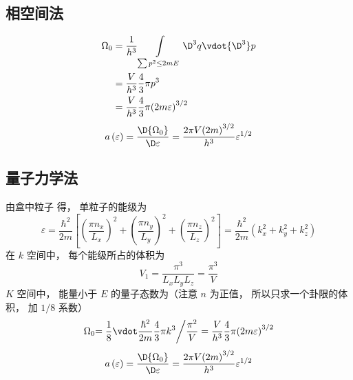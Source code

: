 
\subsection{相空间法}
\begin{equation}
    \begin{aligned}
    {\Omega_0} & = \frac{1}{{{h^3}}}\int\limits_{\sum {{p^2}}  \le 2mE} {{ \D ^3}q \vdot { \D ^3}p}  \\
    & = \frac{V}{{{h^3}}}\frac{4}{3}\pi {p^3} \\
    & = \frac{V}{{{h^3}}}\frac{4}{3}\pi {\left( {2m\varepsilon } \right)^{3/2}}
    \end{aligned}
  \end{equation}
  \begin{equation}
    a\left( \varepsilon  \right) = \frac{{ \D {\Omega_0}}}{{ \D \varepsilon }} = \frac{{2\pi V{{\left( {2m} \right)}^{3/2}}}}{{{h^3}}}{\varepsilon ^{1/2}}
  \end{equation}

\subsection{量子力学法}
由盒中粒子%
得， 单粒子的能级为
\begin{equation}
\varepsilon = \frac{{{\hbar ^2}}}{{2m}}\left[ {{{\left( {\frac{{\pi {n_x}}}{{{L_x}}}} \right)}^2} + {{\left( {\frac{{\pi {n_y}}}{{{L_y}}}} \right)}^2} + {{\left( {\frac{{\pi {n_z}}}{{{L_z}}}} \right)}^2}} \right] = \frac{{{\hbar ^2}}}{{2m}}\left( {k_x^2 + k_y^2 + k_z^2} \right)
\end{equation}
在 $k$ 空间中， 每个能级所占的体积为
\begin{equation}
{V_1} = \frac{{{\pi ^3}}}{{{L_x}{L_y}{L_z}}} = \frac{{{\pi ^3}}}{V}
\end{equation}
  $K$ 空间中， 能量小于 $E$ 的量子态数为（注意 $n$ 为正值， 所以只求一个卦限的体积， 加 $1/8$ 系数）
\begin{equation}
    {\Omega_0}{{ = \frac{1}{8} \vdot \frac{{{\hbar ^2}}}{{2m}}\frac{4}{3}\pi {k^3}} \mathord{\left/
 {\vphantom {{ = \frac{1}{8} \vdot \frac{{{\hbar ^2}}}{{2m}}\frac{4}{3}\pi {k^3}} {\frac{{{\pi ^2}}}{V}}}} \right.
 \kern-\nulldelimiterspace} {\frac{{{\pi ^2}}}{V}}} = \frac{V}{{{h^3}}}\frac{4}{3}\pi {\left( {2m\varepsilon } \right)^{3/2}}
\end{equation}
\begin{equation}
      a\left( \varepsilon  \right) = \frac{{ \D {\Omega_0}}}{{ \D \varepsilon }} = \frac{{2\pi V{{\left( {2m} \right)}^{3/2}}}}{{{h^3}}}{\varepsilon ^{1/2}}
\end{equation}

